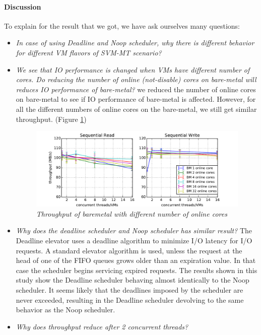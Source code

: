 \documentclass{acmsig}
\begin{document}
\paragraph{Discussion}
To explain for the result that we got, we have ask ourselves many questions:
\begin{itemize}
 \item \textit{In case of using Deadline and Noop scheduler, why there is different behavior for different VM flavors of SVM-MT scenario?}
 \item \textit{We see that IO performance is changed when VMs have different number of cores. Do reducing the number of online (not-disable) cores on bare-metal will reduces IO performance of bare-metal?} we reduced the number of online cores on bare-metal to see if IO performance of bare-metal is affected. However, for all the different numbers of online cores on the bare-metal, we still get similar throughput. (Figure \ref{fig:throughputbmdiffonlinecore})
     \begin{figure}[t]
      \centering
      \includegraphics[scale=0.7]{figures/throughput_cfq_bmdiffonlinecore.pdf}
      \caption{\textit{Throughput of baremetal with different number of online cores}}
      \label{fig:throughputbmdiffonlinecore}
     \end{figure}
 \item \textit{Why does the deadline scheduler and Noop scheduler has similar result?} The Deadline elevator uses a deadline algorithm to minimize I/O latency for I/O requests. A standard elevator algorithm is used, unless the request at the head of one of the FIFO queues grows older than an expiration value. In that case the scheduler begins servicing expired requests. The results shown in this study show the Deadline scheduler behaving almost identically to the Noop scheduler. It seems likely that the deadlines imposed by the scheduler are never exceeded, resulting in the Deadline scheduler devolving to the same behavior as the Noop scheduler.
 \item \textit{Why does throughput reduce after 2 concurrent threads?} %

\end{itemize}
\end{document}

